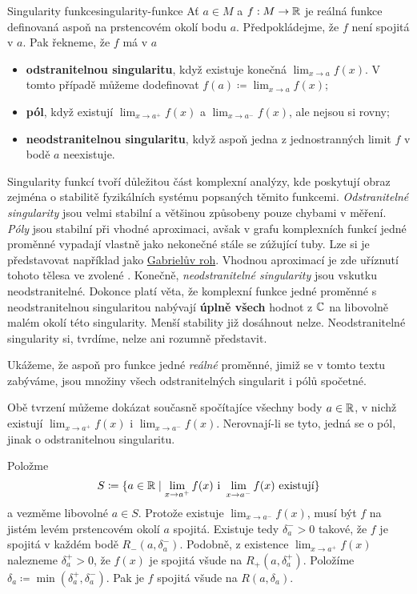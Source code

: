 \begin{example}{Singularity funkce}{singularity-funkce}
 Ať $a \in M$ a $f:M \to \mathbb{R}$ je reálná funkce definovaná aspoň na prstencovém
 okolí bodu $a$. Předpokládejme, že $f$ není spojitá v $a$. Pak řekneme, že $f$
 má v $a$
 \begin{itemize}
  \item \textbf{odstranitelnou singularitu}, když existuje konečná
   $\lim_{x \to a} f(x)$. V tomto případě můžeme dodefinovat $f(a) \coloneqq
   \lim_{x \to a} f(x)$;
  \item \textbf{pól}, když existují $\lim_{x \to a^{+}} f(x)$ a
   $\lim_{x \to a^{-}} f(x)$, ale nejsou si rovny;
  \item \textbf{neodstranitelnou singularitu}, když aspoň jedna z jednostranných
   limit $f$ v bodě $a$ neexistuje.
 \end{itemize}
 Singularity funkcí tvoří důležitou část komplexní analýzy, kde poskytují obraz
 zejména o stabilitě fyzikálních systému popsaných těmito funkcemi.
 \emph{Odstranitelné singularity} jsou velmi stabilní a většinou způsobeny pouze
 chybami v měření. \emph{Póly} jsou stabilní při vhodné aproximaci, avšak v
 grafu komplexních funkcí jedné proměnné vypadají vlastně jako nekonečné stále
 se zúžující tuby. Lze si je představovat například jako
 \href{https://cs.wikipedia.org/wiki/Gabriel%C5%AFv_roh}{Gabrielův roh}. Vhodnou
  aproximací je zde uříznutí tohoto tělesa ve zvolené . Konečně,
  \emph{neodstranitelné singularity} jsou vskutku neodstranitelné. Dokonce platí
  věta, že komplexní funkce jedné proměnné s neodstranitelnou singularitou
  nabývají \textbf{úplně všech} hodnot z $\mathbb{C}$ na libovolně malém okolí této
  singularity. Menší stability již dosáhnout nelze. Neodstranitelné singularity
  si, tvrdíme, nelze ani rozumně představit.

 Ukážeme, že aspoň pro funkce jedné \emph{reálné} proměnné, jimiž se v tomto
 textu zabýváme, jsou množiny všech odstranitelných singularit i pólů spočetné.

 Obě tvrzení můžeme dokázat současně spočítajíce všechny body $a \in \mathbb{R}$, v
 nichž existují $\lim_{x \to a^{+}} f(x)$ i $\lim_{x \to a^{-}} f(x)$.
 Nerovnají-li se tyto, jedná se o pól, jinak o odstranitelnou singularitu.

 Položme
 \[
  S \coloneqq \{a \in \mathbb{R} \mid \lim_{x \to a^{+}} f(x) \text{ i } \lim_{x \to
  a^{-}} f(x) \text{ existují}\}
 \]
 a vezměme libovolné $a \in S$. Protože existuje $\lim_{x \to a^{-}} f(x)$, musí
 být $f$ na jistém levém prstencovém okolí $a$ spojitá. Existuje tedy
 $\delta_a^{-}>0$ takové, že $f$ je spojitá v každém bodě $R_-(a,\delta_a^{-})$.
 Podobně, z existence $\lim_{x \to a^{+}} f(x)$ nalezneme $\delta_a^{+} > 0$, že
 $f(x)$ je spojitá všude na $R_+(a,\delta_a^{+})$. Položíme $\delta_a \coloneqq
 \min(\delta_a^{+},\delta_a^{-})$. Pak je $f$ spojitá všude na $R(a,\delta_a)$.


\end{example}
